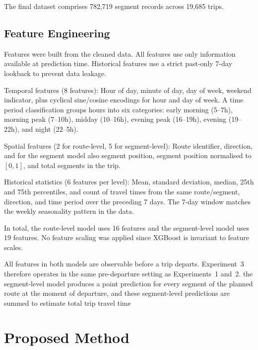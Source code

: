 \documentclass[12pt, a4paper, oneside]{report}
\begin{document}
The final dataset comprises 782,719 segment records across 19,685 trips.

\subsection{Feature Engineering}
\label{subsec:feature_engineering}

Features were built from the cleaned data. All features use only information available at prediction time. Historical features use a strict past-only 7-day lookback to prevent data leakage.

Temporal features (8 features): Hour of day, minute of day, day of week, weekend indicator, plus cyclical sine/cosine encodings for hour and day of week. A time period classification groups hours into six categories: early morning (5--7h), morning peak (7--10h), midday (10--16h), evening peak (16--19h), evening (19--22h), and night (22--5h).

Spatial features (2 for route-level, 5 for segment-level): Route identifier, direction, and for the segment model also segment position, segment position normalised to $[0,1]$, and total segments in the trip.

Historical statistics (6 features per level): Mean, standard deviation, median, 25th and 75th percentiles, and count of travel times from the same route/segment, direction, and time period over the preceding 7 days. The 7-day window matches the weekly seasonality pattern in the data.

In total, the route-level model uses 16 features and the segment-level model uses 19 features. No feature scaling was applied since XGBoost is invariant to feature scales.

All features in both models are observable before a trip departs. Experiment~3 therefore operates in the same pre-departure setting as Experiments~1 and~2. the segment-level model produces a point prediction for every segment of the planned route at the moment of departure, and these segment-level predictions are summed to estimate total trip travel time


\section{Proposed Method}
\label{sec:proposed_method}
\end{document}

